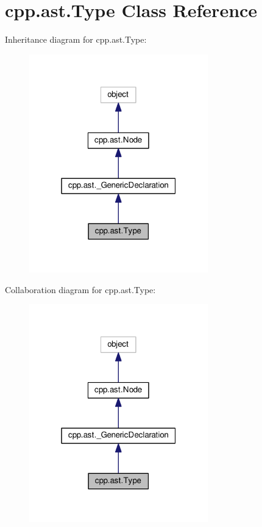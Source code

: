 \hypertarget{classcpp_1_1ast_1_1Type}{}\section{cpp.\+ast.\+Type Class Reference}
\label{classcpp_1_1ast_1_1Type}


Inheritance diagram for cpp.\+ast.\+Type\+:\nopagebreak
\begin{figure}[H]
\begin{center}
\leavevmode
\includegraphics[width=220pt]{classcpp_1_1ast_1_1Type__inherit__graph}
\end{center}
\end{figure}


Collaboration diagram for cpp.\+ast.\+Type\+:\nopagebreak
\begin{figure}[H]
\begin{center}
\leavevmode
\includegraphics[width=220pt]{classcpp_1_1ast_1_1Type__coll__graph}
\end{center}
\end{figure}

